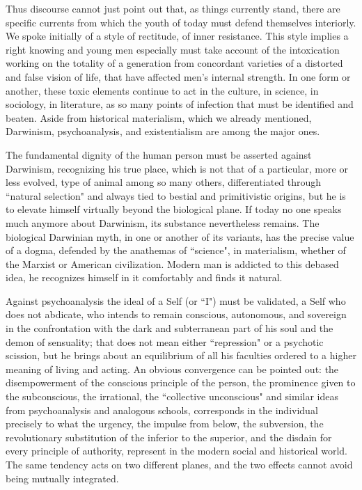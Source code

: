 Thus discourse cannot just point out that, as things currently stand, there are specific currents from which the youth of today must defend themselves interiorly. We spoke initially of a style of rectitude, of inner resistance. This style implies a right knowing and young men especially must take account of the intoxication working on the totality of a generation from concordant varieties of a distorted and false vision of life, that have affected men's internal strength. In one form or another, these toxic elements continue to act in the culture, in science, in sociology, in literature, as so many points of infection that must be identified and beaten. Aside from historical materialism, which we already mentioned, Darwinism, psychoanalysis, and existentialism are among the major ones.

The fundamental dignity of the human person must be asserted against Darwinism, recognizing his true place, which is not that of a particular, more or less evolved, type of animal among so many others, differentiated through ``natural selection" and always tied to bestial and primitivistic origins, but he is to elevate himself virtually beyond the biological plane. If today no one speaks much anymore about Darwinism, its substance nevertheless remains. The biological Darwinian myth, in one or another of its variants, has the precise value of a dogma, defended by the anathemas of ``science", in materialism, whether of the Marxist or American civilization. Modern man is addicted to this debased idea, he recognizes himself in it comfortably and finds it natural.

Against psychoanalysis the ideal of a Self (or ``I") must be validated, a Self who does not abdicate, who intends to remain conscious, autonomous, and sovereign in the confrontation with the dark and subterranean part of his soul and the demon of sensuality; that does not mean either ``repression" or a psychotic scission, but he brings about an equilibrium of all his faculties ordered to a higher meaning of living and acting. An obvious convergence can be pointed out: the disempowerment of the conscious principle of the person, the prominence given to the subconscious, the irrational, the ``collective unconscious" and similar ideas from psychoanalysis and analogous schools, corresponds in the individual precisely to what the urgency, the impulse from below, the subversion, the revolutionary substitution of the inferior to the superior, and the disdain for every principle of authority, represent in the modern social and historical world. The same tendency acts on two different planes, and the two effects cannot avoid being mutually integrated.

